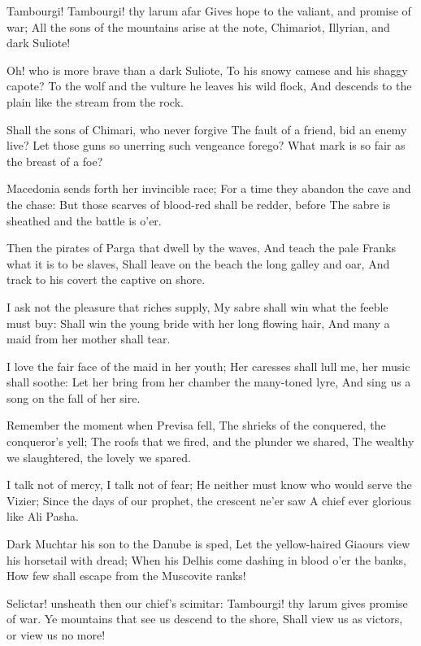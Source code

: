 \documentclass[10pt,twocolumn]{book}
\begin{document}
{
  \Forma {}
  \Facies          {\strophe}

Tambourgi! Tambourgi! thy larum afar
Gives hope to the valiant, and promise of war;
All the sons of the mountains arise at the note,
Chimariot, Illyrian, and dark Suliote!

Oh! who is more brave than a dark Suliote,
To his snowy camese and his shaggy capote?
To the wolf and the vulture he leaves his wild flock,
And descends to the plain like the stream from the rock.

Shall the sons of Chimari, who never forgive
The fault of a friend, bid an enemy live?
Let those guns so unerring such vengeance forego?
What mark is so fair as the breast of a foe?

Macedonia sends forth her invincible race;
For a time they abandon the cave and the chase:
But those scarves of blood-red shall be redder, before
The sabre is sheathed and the battle is o'er.

Then the pirates of Parga that dwell by the waves,
And teach the pale Franks what it is to be slaves,
Shall leave on the beach the long galley and oar,
And track to his covert the captive on shore.

I ask not the pleasure that riches supply,
My sabre shall win what the feeble must buy:
Shall win the young bride with her long flowing hair,
And many a maid from her mother shall tear.

I love the fair face of the maid in her youth;
Her caresses shall lull me, her music shall soothe:
Let her bring from her chamber the many-toned lyre,
And sing us a song on the fall of her sire.

Remember the moment when Previsa fell,
The shrieks of the conquered, the conqueror's yell;
The roofs that we fired, and the plunder we shared,
The wealthy we slaughtered, the lovely we spared.

I talk not of mercy, I talk not of fear;
He neither must know who would serve the Vizier;
Since the days of our prophet, the crescent ne'er saw
A chief ever glorious like Ali Pasha.

Dark Muchtar his son to the Danube is sped,
Let the yellow-haired Giaours view his horsetail with dread;
When his Delhis come dashing in blood o'er the banks,
How few shall escape from the Muscovite ranks!

Selictar! unsheath then our chief's scimitar:
Tambourgi! thy larum gives promise of war.
Ye mountains that see us descend to the shore,
Shall view us as victors, or view us no more!
}
\end{document}
